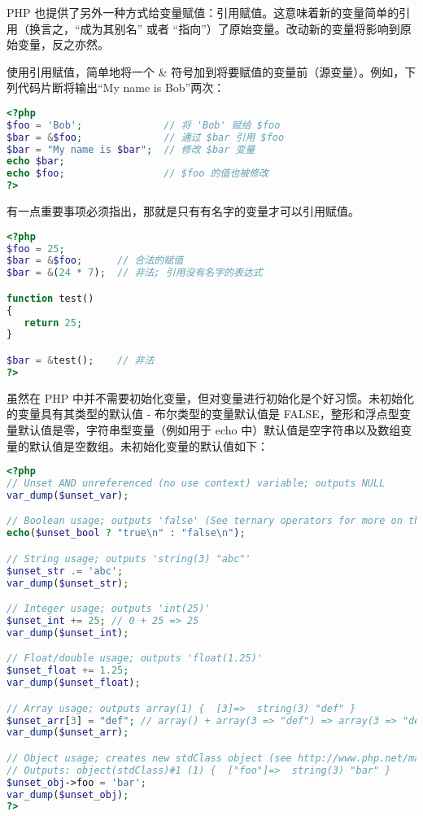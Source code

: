 PHP 也提供了另外一种方式给变量赋值：引用赋值。这意味着新的变量简单的引用（换言之，“成为其别名” 或者 “指向”）了原始变量。改动新的变量将影响到原始变量，反之亦然。

使用引用赋值，简单地将一个 \& 符号加到将要赋值的变量前（源变量）。例如，下列代码片断将输出“My name is Bob”两次：

\begin{lstlisting}[language=PHP]
<?php
$foo = 'Bob';              // 将 'Bob' 赋给 $foo
$bar = &$foo;              // 通过 $bar 引用 $foo
$bar = "My name is $bar";  // 修改 $bar 变量
echo $bar;
echo $foo;                 // $foo 的值也被修改
?>
\end{lstlisting}

有一点重要事项必须指出，那就是只有有名字的变量才可以引用赋值。

\begin{lstlisting}[language=PHP]
<?php
$foo = 25;
$bar = &$foo;      // 合法的赋值
$bar = &(24 * 7);  // 非法; 引用没有名字的表达式

function test()
{
   return 25;
}

$bar = &test();    // 非法
?>
\end{lstlisting}

虽然在 PHP 中并不需要初始化变量，但对变量进行初始化是个好习惯。未初始化的变量具有其类型的默认值 - 布尔类型的变量默认值是 FALSE，整形和浮点型变量默认值是零，字符串型变量（例如用于 echo 中）默认值是空字符串以及数组变量的默认值是空数组。未初始化变量的默认值如下：


\begin{lstlisting}[language=PHP]
<?php
// Unset AND unreferenced (no use context) variable; outputs NULL
var_dump($unset_var);

// Boolean usage; outputs 'false' (See ternary operators for more on this syntax)
echo($unset_bool ? "true\n" : "false\n");

// String usage; outputs 'string(3) "abc"'
$unset_str .= 'abc';
var_dump($unset_str);

// Integer usage; outputs 'int(25)'
$unset_int += 25; // 0 + 25 => 25
var_dump($unset_int);

// Float/double usage; outputs 'float(1.25)'
$unset_float += 1.25;
var_dump($unset_float);

// Array usage; outputs array(1) {  [3]=>  string(3) "def" }
$unset_arr[3] = "def"; // array() + array(3 => "def") => array(3 => "def")
var_dump($unset_arr);

// Object usage; creates new stdClass object (see http://www.php.net/manual/en/reserved.classes.php)
// Outputs: object(stdClass)#1 (1) {  ["foo"]=>  string(3) "bar" }
$unset_obj->foo = 'bar';
var_dump($unset_obj);
?>
\end{lstlisting}


